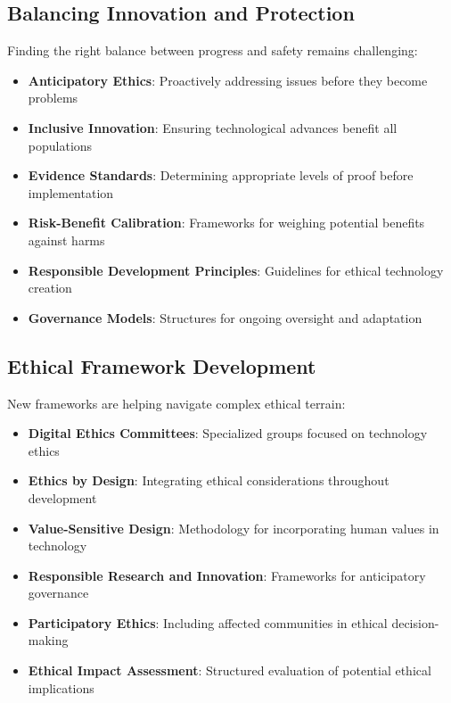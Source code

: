 \subsection{Balancing Innovation and Protection}
Finding the right balance between progress and safety remains challenging:

\begin{itemize}
    \item \textbf{Anticipatory Ethics}: Proactively addressing issues before they become problems
    
    \item \textbf{Inclusive Innovation}: Ensuring technological advances benefit all populations
    
    \item \textbf{Evidence Standards}: Determining appropriate levels of proof before implementation
    
    \item \textbf{Risk-Benefit Calibration}: Frameworks for weighing potential benefits against harms
    
    \item \textbf{Responsible Development Principles}: Guidelines for ethical technology creation
    
    \item \textbf{Governance Models}: Structures for ongoing oversight and adaptation
\end{itemize}

\subsection{Ethical Framework Development}
New frameworks are helping navigate complex ethical terrain:

\begin{itemize}
    \item \textbf{Digital Ethics Committees}: Specialized groups focused on technology ethics
    
    \item \textbf{Ethics by Design}: Integrating ethical considerations throughout development
    
    \item \textbf{Value-Sensitive Design}: Methodology for incorporating human values in technology
    
    \item \textbf{Responsible Research and Innovation}: Frameworks for anticipatory governance
    
    \item \textbf{Participatory Ethics}: Including affected communities in ethical decision-making
    
    \item \textbf{Ethical Impact Assessment}: Structured evaluation of potential ethical implications
\end{itemize}

